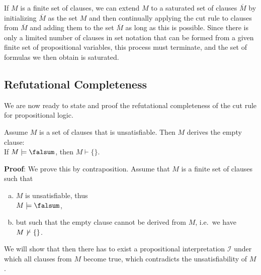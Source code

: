 \remarkEng
If $M$ is a finite set of clauses, we can extend $M$ to a saturated set of clauses
$\overline{M}$ by initializing $\overline{M}$ as the set $M$ and then continually applying the
cut rule to clauses from $\overline{M}$ and adding them to the set $\overline{M}$ as long as this is possible.
Since there is only a limited number of clauses in set notation that can be formed from a given finite set of
propositional variables, this process must terminate, and the set of formulas we then obtain is saturated. \eox 

\subsection{Refutational Completeness}
We are now ready to state and proof the refutational completeness of the cut rule for propositional logic.

\begin{Satz}[\textcolor{blue}{Refutation Completeness}] \label{widerlegungs-vollstaendig} \hspace*{\fill} \linebreak
  Assume $M$ is a set of clauses that is unsatisfiable.  Then $M$ derives the empty clause:
  \\[0.2cm]
  \hspace*{1.3cm} 
  If $M \models \falsum$, then $M \vdash \{\}$.
\end{Satz}

\noindent
\textbf{Proof}: We prove this by contraposition. Assume that $M$ is a finite set of clauses such that
\begin{enumerate}[(a)]
\item $M$ is unsatisfiable, thus
      \\[0.2cm]
      \hspace*{1.3cm}
      $M \models \falsum$,
\item but such that the empty clause cannot be derived from $M$, i.e.~we have
      \\[0.2cm]
      \hspace*{1.3cm}
      $M \not\,\vdash \{\}$.
\end{enumerate}
We will show that then there has to exist a propositional interpretation $\mathcal{I}$ under which all clauses
from $M$ become true, which contradicts the unsatisfiability of $M$. 

